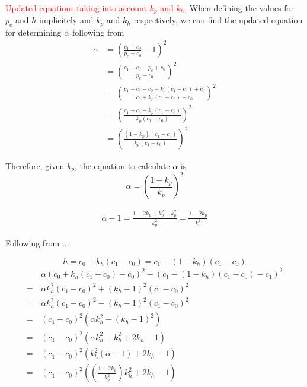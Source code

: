 \textcolor{red}{Updated equations taking into account $k_p$ and $k_h$.}
When defining the values for $p_e$ and $h$ implicitely and $k_p$ and $k_h$ respectively, we can find the updated equation for determining $\alpha$ following from 
\begin{equation*}\begin{split}
		\alpha & = \left( \frac{c_1-c_0}{p_e-c_0} -1 \right)^2 \\
		& = \left( \frac{c_1-c_0-p_e+c_0}{p_e-c_0} \right)^2 \\
		& = \left( \frac{c_1-c_0 -c_0-k_p(c_1-c_0)+c_0}{c_0 + k_p(c_1-c_0)-c_0} \right)^2\\
		& = \left( \frac{c_1-c_0-k_p(c_1-c_0)}{k_p(c_1-c_0)} \right)^2\\
		& = \left( \frac{(1-k_p)(c_1-c_0)}{k_p(c_1-c_0)} \right)^2
\end{split}\end{equation*}

Therefore, given $k_p$, the equation to calculate $\alpha$ is
\begin{equation}
	\alpha = \left( \frac{1-k_p}{k_p} \right)^2
\end{equation}

\begin{equation}\begin{split}
	\alpha-1 = \frac{1-2k_p+k_p^2-k_p^2}{k_p^2} = \frac{1-2k_p}{k_p^2}
\end{split}\end{equation}

Following from ...

\begin{equation*}
	h = c_0+k_h(c_1-c_0) = c_1-(1-k_h)(c_1-c_0)
\end{equation*}
\begin{equation*}\begin{split}
	&\alpha (c_0+k_h(c_1-c_0)-c_0)^2-(c_1-(1-k_h)(c_1-c_0)-c_1)^2\\
	=\,& \alpha k_h^2 (c_1-c_0)^2 + (k_h-1)^2(c_1-c_0)^2 \\
	=\,& \alpha k_h^2(c_1-c_0)^2-(k_h-1)^2(c_1-c_0)^2 \\
	=\,& (c_1-c_0)^2(\alpha k_h^2-(k_h-1)^2)\\
	=\,& (c_1-c_0)^2 \left( \alpha k_h^2 - k_h^2 + 2k_h - 1 \right)\\
	=\,& (c_1-c_0)^2 \left( k_h^2(\alpha-1) + 2k_h -1 \right) \\
	=\,& (c_1-c_0)^2\left( \left( \frac{1-2k_p}{k_p^2} \right)k_h^2 +2k_h -1 \right)
\end{split}\end{equation*}

